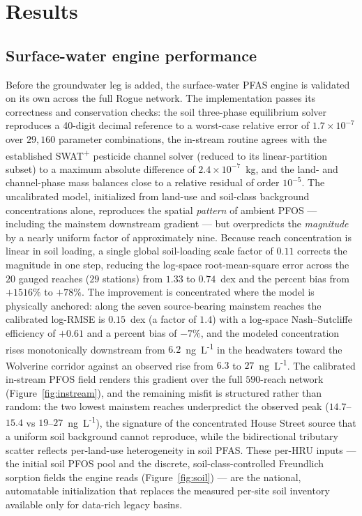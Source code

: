 \section{Results}
\label{sec:results}

\subsection{Surface-water engine performance}
Before the groundwater leg is added, the surface-water PFAS engine is validated on its own across
the full Rogue network. The implementation passes its correctness and conservation checks: the soil
three-phase equilibrium solver reproduces a 40-digit decimal reference to a worst-case relative error
of $1.7\times10^{-7}$ over $29{,}160$ parameter combinations, the in-stream routine agrees with the
established SWAT\textsuperscript{+} pesticide channel solver (reduced to its linear-partition subset)
to a maximum absolute difference of $2.4\times10^{-7}$~kg, and the land- and channel-phase mass
balances close to a relative residual of order $10^{-5}$. The uncalibrated model, initialized from
land-use and soil-class background concentrations alone, reproduces the spatial \emph{pattern} of
ambient PFOS --- including the mainstem downstream gradient --- but overpredicts the \emph{magnitude}
by a nearly uniform factor of approximately nine. Because reach concentration is linear in soil
loading, a single global soil-loading scale factor of $0.11$ corrects the magnitude in one step,
reducing the log-space root-mean-square error across the $20$ gauged reaches ($29$ stations) from
$1.33$ to $0.74$~dex and the percent bias from $+1516\%$ to $+78\%$. The improvement is concentrated
where the model is physically anchored: along the seven source-bearing mainstem reaches the
calibrated log-RMSE is $0.15$~dex (a factor of $1.4$) with a log-space Nash--Sutcliffe efficiency of
$+0.61$ and a percent bias of $-7\%$, and the modeled concentration rises monotonically downstream
from $6.2$~ng~L\textsuperscript{-1} in the headwaters toward the Wolverine corridor against an
observed rise from $6.3$ to $27$~ng~L\textsuperscript{-1}. The calibrated in-stream PFOS field
renders this gradient over the full $590$-reach network (Figure~\ref{fig:instream}), and the
remaining misfit is structured rather than random: the two lowest mainstem reaches underpredict the
observed peak ($14.7$--$15.4$ vs $19$--$27$~ng~L\textsuperscript{-1}), the signature of the
concentrated House Street source that a uniform soil background cannot reproduce, while the
bidirectional tributary scatter reflects per-land-use heterogeneity in soil PFAS. These per-HRU
inputs --- the initial soil PFOS pool and the discrete, soil-class-controlled Freundlich sorption
fields the engine reads (Figure~\ref{fig:soil}) --- are the national, automatable initialization
that replaces the measured per-site soil inventory available only for data-rich legacy basins.

